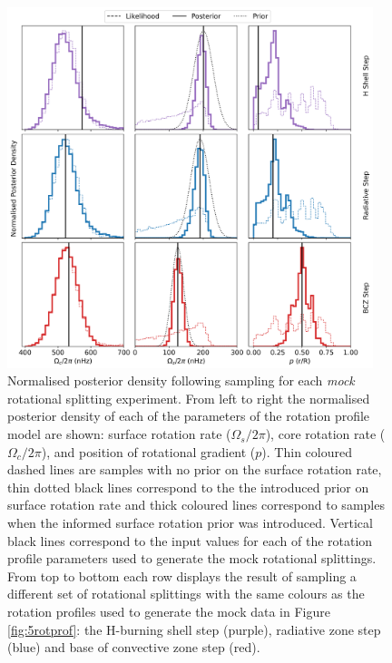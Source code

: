 
\begin{figure}
\centering
    \includegraphics[width=0.95\textwidth]{Figures/subgiant_chapter_figures/combined_results.png}
    \caption{Normalised posterior density following sampling for each \textit{mock} rotational splitting experiment. From left to right the normalised posterior density of each of the parameters of the rotation profile model are shown: surface rotation rate ($\Omega_s/2\pi$), core rotation rate ($\Omega_c/2\pi$), and position of rotational gradient ($p$). Thin coloured dashed lines are samples with no prior on the surface rotation rate, thin dotted black lines correspond to the the introduced prior on surface rotation rate and thick coloured lines correspond to samples when the informed surface rotation prior was introduced. Vertical black lines correspond to the input values for each of the rotation profile parameters used to generate the mock rotational splittings. From top to bottom each row displays the result of sampling a different set of rotational splittings with the same colours as the rotation profiles used to generate the mock data in Figure \ref{fig:5rotprof}: the H-burning shell step (purple), radiative zone step (blue) and base of convective zone step (red).} 
    \label{fig:full_results}
\end{figure}

